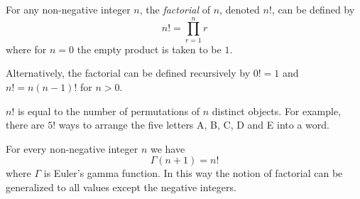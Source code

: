 \documentclass[12pt]{article}
\begin{document}

For any non-negative integer $n$, the {\em factorial} of $n$, denoted $n!$, can be defined by
$$n!=\prod_{r=1}^n r$$
where for $n=0$ the empty product is taken to be $1$.

Alternatively, the factorial can be defined recursively by $0!=1$ and $n!=n(n-1)!$ for $n>0$.

$n!$ is equal to the number of permutations of $n$ distinct objects.
For example, there are $5!$ ways to arrange the five letters A, B, C, D and E into a word.

For every non-negative integer $n$ we have
$$\Gamma(n+1) = n!$$
where $\Gamma$ is Euler's gamma function.
In this way the notion of factorial can be generalized to all  values except the negative integers.
\end{document}
